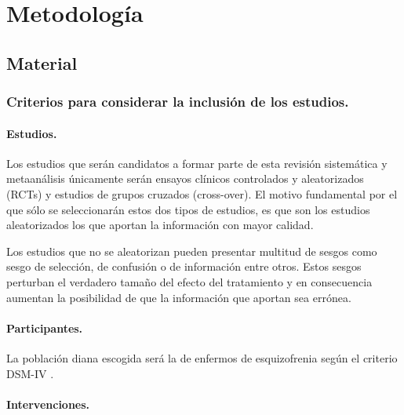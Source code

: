 \documentclass[a4paper,openright,12pt]{report}
\begin{document}
\chapter{Metodología}\label{cap.metodología}
\section{Material}
\subsection{Criterios para considerar la inclusión de los estudios.}
\subsubsection{Estudios.}

Los estudios que serán candidatos a formar parte de esta revisión sistemática y metaanálisis únicamente serán ensayos clínicos controlados y aleatorizados (RCTs) y estudios de grupos cruzados (cross-over). El motivo fundamental por el que sólo se seleccionarán estos dos tipos de estudios, es que son los estudios aleatorizados los que aportan la información con mayor calidad.

Los estudios que no se aleatorizan pueden presentar multitud de sesgos como sesgo de selección, de confusión o de información entre otros. Estos sesgos perturban el verdadero tamaño del efecto del tratamiento y en consecuencia aumentan la posibilidad de que la información que aportan sea errónea. 

\subsubsection{Participantes.}

La población diana escogida será la de enfermos de esquizofrenia según el criterio DSM-IV \cite{DSMIV1994}.

\subsubsection{Intervenciones.}
\end{document}
